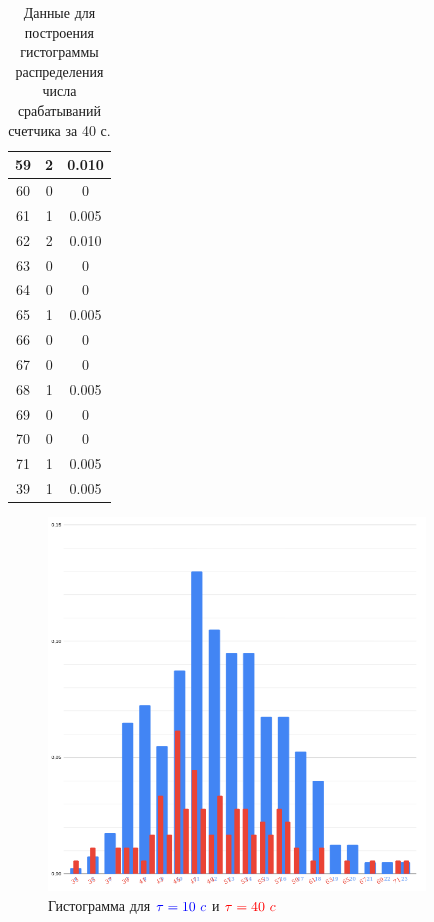 \documentclass[a4paper, 12pt]{article}
\begin{document}
\begin{enumerate}
\begin{table}[h!]
\begin{tabular}{| c | c | c |}
        59 & 2  & 0.010  \\\hline
        60 & 0  & 0     \\\hline
        61 & 1  & 0.005 \\\hline
        62 & 2  & 0.010  \\\hline
        63 & 0  & 0     \\\hline
        64 & 0  & 0     \\\hline
        65 & 1  & 0.005 \\\hline
        66 & 0  & 0     \\\hline
        67 & 0  & 0     \\\hline
        68 & 1  & 0.005 \\\hline
        69 & 0  & 0     \\\hline
        70 & 0  & 0     \\\hline
        71 & 1  & 0.005 \\\hline
        39 & 1  & 0.005 \\\hline
        \end{tabular}
        \caption{Данные для построения гистограммы распределения числа срабатываний счетчика за 40 с.}
        \label{tabl:data_hist_40}
    \end{table}

    \begin{figure}[h!]
        \centering
        \includegraphics[width=10cm]{hist.1.1.4.png}
        \caption{Гистограмма для $\textcolor{blue}{\tau = 10~c~}$и $\textcolor{red}{\tau = 40~c}$}
        \label{pic:hists}
    \end{figure}


\end{enumerate}
\end{document}
